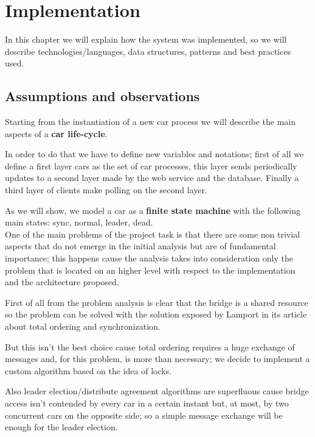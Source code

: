 \chapter{Implementation}\label{ch:implementation}

In this chapter we will explain how the system was implemented, so we will describe 
technologies/languages, data structures, patterns and best practices used.

\section{Assumptions and observations}

Starting from the instantiation of a new car process we will describe the main aspects 
of a \textbf{car life-cycle}. 

In order to do that we have to define new variables and notations; 
first of all we define a first layer cars as the set of car processes, 
this layer sends periodically updates to a second layer made by 
the web service and the database. 
Finally a third layer of clients make polling on the second layer.

As we will show, we model a car as a \textbf{finite state machine} 
with the following main states: sync, normal, leader, dead.\\

\noindent
One of the main problems of the project task is that there are some non trivial aspects 
that do not emerge in the initial analysis but are of fundamental importance; 
this happens cause the analysis takes into consideration only the problem 
that is located on an higher level with respect to the implementation and the 
architecture proposed.

First of all from the problem analysis is clear that the bridge is a shared resource 
so the problem can be solved with the solution exposed by Lamport in its 
article~\cite{Lamport:1978} about total ordering and synchronization. 

But this isn't the best choice cause total ordering requires a huge exchange of 
messages and, for this problem, is more than necessary; we decide to implement a 
custom algorithm based on the idea of locks.

Also leader election/distribute agreement algorithms are superfluous cause bridge 
access isn't contended by every car in a certain instant but, at most, 
by two concurrent cars on the opposite side; so a simple message exchange 
will be enough for the leader election. \\

